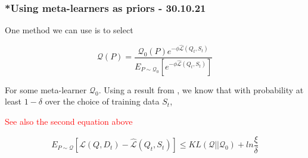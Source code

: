 \documentclass[letterpaper]{article}
\theoremstyle{definition}
\begin{document}
%
%
%
%
%
%
%
%

\subsubsection{*Using meta-learners as priors - 30.10.21}

One method we can use is to select 

$$ \mathcal{Q}(P) = \frac{\mathcal{Q}_0(P)e^{-\phi \hat{\mathcal{L}}(Q_t, S_t)}}{E_{P\sim \mathcal{Q}_0} \left [e^{-\phi \hat{\mathcal{L}}(Q_t, S_t)}\right ]}$$

For some meta-learner $\mathcal{Q}_0$.
Using a result from \cite{Rivasplata2020}, we know that with probability at least $1-\delta$ over the choice of training data $S_t$,

\textcolor{red}{See also the second equation above}

$$ E_{P\sim \mathcal{Q}} \left [\mathcal{L}(Q, D_t) - \hat{\mathcal{L}}(Q_t, S_t) \right ] \leq KL(\mathcal{Q}||\mathcal{Q}_0) + ln\frac{\xi}{\delta} $$
\end{document}
